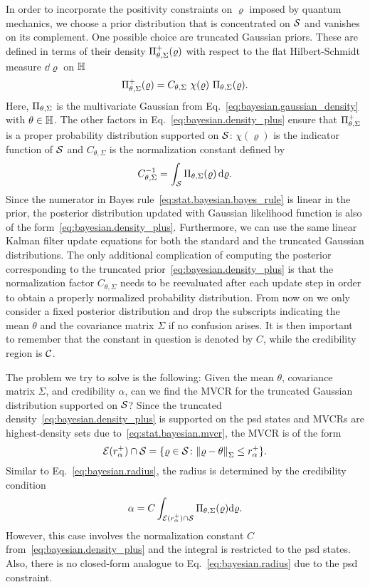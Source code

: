 In order to incorporate the positivity constraints on $\varrho$ imposed by quantum mechanics, we choose a prior distribution that is concentrated on $\mathcal{S}$ and vanishes on its complement.
One possible choice are truncated Gaussian priors.
These are defined in terms of their density $\Pi_{\theta,\Sigma}^+(\varrho)$ with respect to the flat Hilbert-Schmidt measure $\dd\varrho$ on $\mathbb{H}$
\[
  \label{eq:bayesian.density_plus}
  \Pdf^+_{\theta,\Sigma}(\varrho) = C_{\theta,\Sigma}\ \chi(\varrho)\ \Pdf_{\theta,\Sigma}(\varrho).
\]
Here, $\Pi_{\theta,\Sigma}$ is the multivariate Gaussian from Eq.~\eqref{eq:bayesian.gaussian_density} with $\theta \in \mathbb{H}$.
The other factors in Eq.~\eqref{eq:bayesian.density_plus} ensure that $\Pi^+_{\theta,\Sigma}$ is a proper probability distribution supported on $\mathcal{S}$:
$\chi(\varrho)$ is the indicator function of $\mathcal{S}$ and $C_{\theta,\Sigma}$ is the normalization constant defined by
\[
  \label{eq:bayes.normalization_factor}
  C_{\theta,\Sigma}^{-1} = \int_{\mathcal{S}} \Pi_{\theta,\Sigma}(\varrho) \,\mathrm{d}\varrho.
\]
Since the numerator in Bayes rule~\eqref{eq:stat.bayesian.bayes_rule} is linear in the prior, the posterior distribution updated with Gaussian likelihood function is also of the form~\eqref{eq:bayesian.density_plus}.
Furthermore, we can use the same linear Kalman filter update equations for both the standard and the truncated Gaussian distributions.
The only additional complication of computing the posterior corresponding to the truncated prior~\eqref{eq:bayesian.density_plus} is that the normalization factor $C_{\theta,\Sigma}$ needs to be reevaluated after each update step in order to obtain a properly normalized probability distribution.
From now on we only consider a fixed posterior distribution and drop the subscripts indicating the mean $\theta$ and the covariance matrix $\Sigma$ if no confusion arises.
It is then important to remember that the constant in question is denoted by $C$, while the credibility region is $\mathcal{C}$.

The problem we try to solve is the following:
Given the mean $\theta$, covariance matrix $\Sigma$, and credibility $\alpha$, can we find the MVCR for the truncated Gaussian distribution supported on $\mathcal{S}$?
Since the truncated density~\eqref{eq:bayesian.density_plus} is supported on the psd states and MVCRs are highest-density sets due to~\eqref{eq:stat.bayesian.mvcr}, the MVCR is of the form
\[
  \mathcal{E}(r^+_{\alpha}) \cap \mathcal{S} = \{ \varrho \in \mathcal{S} \colon {\Vert\varrho - \theta\Vert}_\Sigma \le r^+_{\alpha} \}.
  \label{eq:bayesian.mvcr}
\]
Similar to Eq.~\eqref{eq:bayesian.radius}, the radius is determined by the credibility condition
\[
  \label{eq:bayesian.radius_plus}
  \alpha = C \int_{\mathcal{E}(r^+_{\alpha}) \cap \mathcal{S}} \Pi_{\theta,\Sigma}(\varrho) \mathrm{d} \varrho.
\]
However, this case involves the normalization constant $C$ from~\eqref{eq:bayesian.density_plus} and the integral is restricted to the psd states.
Also, there is no closed-form analogue to Eq.~\eqref{eq:bayesian.radius} due to the psd constraint.

